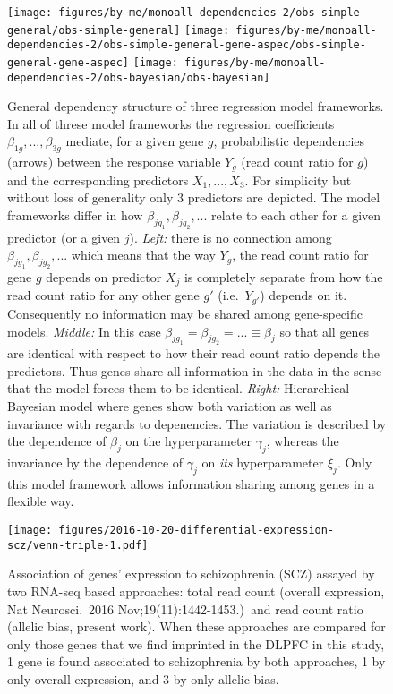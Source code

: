\documentclass[letterpaper]{article}
\begin{document}
\begin{figure}[h]
\begin{center}
\texttt{[image: figures/by-me/monoall-dependencies-2/obs-simple-general/obs-simple-general]}
\hspace{\fill}
\texttt{[image: figures/by-me/monoall-dependencies-2/obs-simple-general-gene-aspec/obs-simple-general-gene-aspec]}
\hspace{\fill}
\texttt{[image: figures/by-me/monoall-dependencies-2/obs-bayesian/obs-bayesian]}
\end{center}
\caption{ General dependency structure of three regression model frameworks.
In all of threse model frameworks the regression coefficients
\(\beta_{1g},...,\beta_{3g}\) mediate, for a given gene \(g\), probabilistic
dependencies (arrows) between the response variable \(Y_g\) (read count ratio
for \(g\)) and the corresponding predictors \(X_1,...,X_3\).  For simplicity
but without loss of generality only 3 predictors are depicted.  The model
frameworks differ in how \(\beta_{jg_1},\beta_{jg_2},...\) relate to each
other for a given predictor (or a given \(j\)).  \emph{Left:} there is no
connection among \(\beta_{jg_1},\beta_{jg_2},...\) which means that the way
\(Y_{g}\), the read count ratio for gene \(g\) depends on predictor \(X_j\) is
completely separate from how the read count ratio for any other gene \(g'\)
(i.e.~\(Y_{g'}\)) depends on it.  Consequently no information may be shared
among gene-specific models.  \emph{Middle:} In this case
\(\beta_{jg_1}=\beta_{jg_2}=...\equiv\beta_j\) so that all genes are identical
with respect to how their read count ratio depends the predictors.  Thus genes
share all information in the data in the sense that the model forces them to
be identical.  \emph{Right:} Hierarchical Bayesian model where genes show both
variation as well as invariance with regards to depenencies.  The variation is
described by the dependence of \(\beta_j\) on the hyperparameter \(\gamma_j\),
whereas the invariance by the dependence of \(\gamma_j\) on \emph{its}
hyperparameter \(\xi_j\).  Only this model framework allows information
sharing among genes in a flexible way.  }
\label{fig:glm-vs-hierarch}
\end{figure}

\begin{figure}[h]
\begin{center}
\texttt{[image: figures/2016-10-20-differential-expression-scz/venn-triple-1.pdf]}
\end{center}
\caption{
Association of genes' expression to schizophrenia (SCZ) assayed by two RNA-seq
based approaches: total read count (overall expression, Nat Neurosci.~2016
Nov;19(11):1442-1453.)~and read count ratio
(allelic bias, present work).  When these approaches are compared for only
those genes that we find imprinted in the DLPFC in this study, 1 gene is found
associated to schizophrenia by both approaches, 1 by only overall expression,
and 3 by only allelic bias.
}
\label{fig:diff-exp-scz}
\end{figure}
\end{document}
